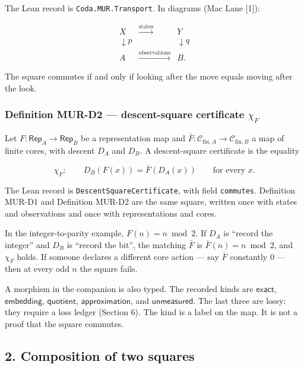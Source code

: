 \documentclass[
  11pt,
]{article}
\begin{document}
The Lean record is \texttt{Coda.MUR.Transport}. In diagrams (Mac Lane {[}1{]}):

\[
\begin{array}{ccc}
X & \xrightarrow{\mathrm{states}} & Y \\
\downarrow p & & \downarrow q \\
A & \xrightarrow{\mathrm{observations}} & B.
\end{array}
\]

The square commutes if and only if looking after the move equals moving after the look.

\subsubsection{\texorpdfstring{Definition MUR-D2 --- descent-square certificate \(\chi_F\)}{Definition MUR-D2 --- descent-square certificate \textbackslash chi\_F}}\label{definition-mur-d2-descent-square-certificate-chi_f}

Let \(F:\mathsf{Rep}_A\to\mathsf{Rep}_B\) be a representation map and \(\bar F:\mathcal C_{\mathrm{fin},A}\to\mathcal C_{\mathrm{fin},B}\) a map of finite cores, with descent \(D_A\) and \(D_B\). A descent-square certificate is the equality

\[
\chi_F:\qquad D_B(F(x))=\bar F(D_A(x))
\qquad\text{for every }x.
\]

The Lean record is \nolinkurl{DescentSquareCertificate}, with field \texttt{commutes}. Definition MUR-D1 and Definition MUR-D2 are the same square, written once with states and observations and once with representations and cores.

In the integer-to-parity example, \(F(n)=n\bmod 2\). If \(D_A\) is ``record the integer'' and \(D_B\) is ``record the bit'', the matching \(\bar F\) is \(\bar F(n)=n\bmod 2\), and \(\chi_F\) holds. If someone declares a different core action --- say \(\bar F\) constantly \(0\) --- then at every odd \(n\) the square fails.

A morphism in the companion is also typed. The recorded kinds are \(\mathsf{exact}\), \(\mathsf{embedding}\), \(\mathsf{quotient}\), \(\mathsf{approximation}\), and \(\mathsf{unmeasured}\). The last three are lossy: they require a loss ledger (Section 6). The kind is a label on the map. It is not a proof that the square commutes.

\subsection{2. Composition of two squares}\label{composition-of-two-squares}
\end{document}
